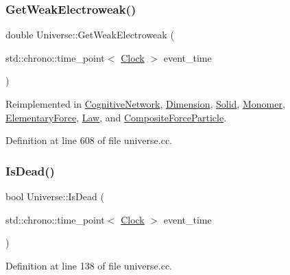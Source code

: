 \subsubsection{\texorpdfstring{Get\+Weak\+Electroweak()}{GetWeakElectroweak()}}
{\footnotesize\ttfamily double Universe\+::\+Get\+Weak\+Electroweak (\begin{DoxyParamCaption}\item[{std\+::chrono\+::time\+\_\+point$<$ \mbox{\hyperlink{universe_8h_a0ef8d951d1ca5ab3cfaf7ab4c7a6fd80}{Clock}} $>$}]{event\+\_\+time }\end{DoxyParamCaption})\hspace{0.3cm}{\ttfamily [virtual]}}



Reimplemented in \mbox{\hyperlink{class_cognitive_network_aa6342c390fe8e7c648b4c6bc8f93ba4a}{Cognitive\+Network}}, \mbox{\hyperlink{class_dimension_a5bb5a164564013a60728854cc2e5ddb3}{Dimension}}, \mbox{\hyperlink{class_solid_ac98f9c827d58a631627423e25dd611ba}{Solid}}, \mbox{\hyperlink{class_monomer_aec6e42dde40c5b3142fab880eabb346a}{Monomer}}, \mbox{\hyperlink{class_elementary_force_a928e06a1fa81b8d7ec4a426d959a0f98}{Elementary\+Force}}, \mbox{\hyperlink{class_law_aad6e54da64a5d8499dcb6c232aa6748f}{Law}}, and \mbox{\hyperlink{class_composite_force_particle_a27762218af4e3c021c89ff4792d81b41}{Composite\+Force\+Particle}}.



Definition at line 608 of file universe.\+cc.

\mbox{\label{class_universe_a8fdaa6d06584e1ef50c4c613b22b786e}} 
\subsubsection{\texorpdfstring{Is\+Dead()}{IsDead()}}
{\footnotesize\ttfamily bool Universe\+::\+Is\+Dead (\begin{DoxyParamCaption}\item[{std\+::chrono\+::time\+\_\+point$<$ \mbox{\hyperlink{universe_8h_a0ef8d951d1ca5ab3cfaf7ab4c7a6fd80}{Clock}} $>$}]{event\+\_\+time }\end{DoxyParamCaption})}



Definition at line 138 of file universe.\+cc.

